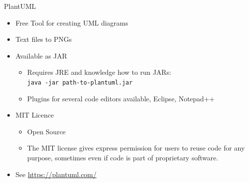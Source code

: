 \begin{frame}{PlantUML}
%
\begin{itemize}
\item Free Tool for creating UML diagrams
\item Text files to PNGs
\item Available as JAR
	\begin{itemize}
	\item Requires JRE and knowledge how to run JARs:\\
		\texttt{java -jar path-to-plantuml.jar}
	\item Plugins for several code editors available, \zB Eclipse, Notepad++
	\end{itemize}
\item MIT Licence
	\begin{itemize}
	\item Open Source
	\item The MIT license gives express permission for users to reuse code for any purpose, sometimes even if code is part of proprietary software. 
	\end{itemize}
\item See \url{https://plantuml.com/}
\end{itemize}
%
\end{frame}


